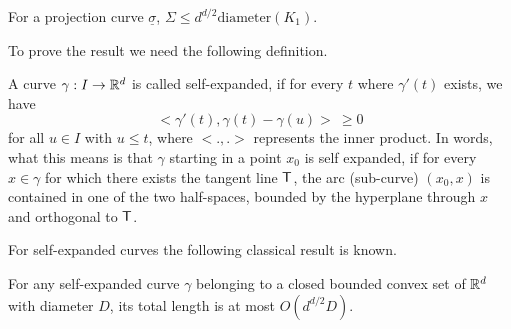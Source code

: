  \begin{lemma}\label{lem:projection}
For a projection curve ${\underline \sigma}$, $\Sigma \le d^{d/2} \text{diameter}(K_1)$.
\end{lemma}


To prove the result we need the following definition.

\begin{definition}\label{defn:se-curve} A curve $\gamma: I \rightarrow {\mathbb{R}}^d$  is called self-expanded, if for every $t$ where 
$\gamma'(t)$ exists, we have 
$$< \gamma'(t), \gamma(t)-\gamma(u)> \ \ge 0$$ for all $u\in I$ with $u \le t$, where $<.,.>$ represents the inner product. 
In words, what this means is that $\gamma$ starting in a point $x_0$ is self expanded, if for every $x\in \gamma$ for which there exists the tangent line $\mathsf{T}$, the arc (sub-curve) $(x_0, x)$ is
contained in one of the two half-spaces, bounded by the hyperplane through
$x$ and orthogonal to $\mathsf{T}$. 
\end{definition}
For self-expanded curves the following classical result is known.
\begin{theorem}\label{thm:manselli}\cite{Manselli}
For any self-expanded curve $\gamma$ belonging to a closed bounded convex set of ${\mathbb{R}}^d$ with diameter $D$, its total length is at most $O(d^{d/2} D)$.
\end{theorem}
